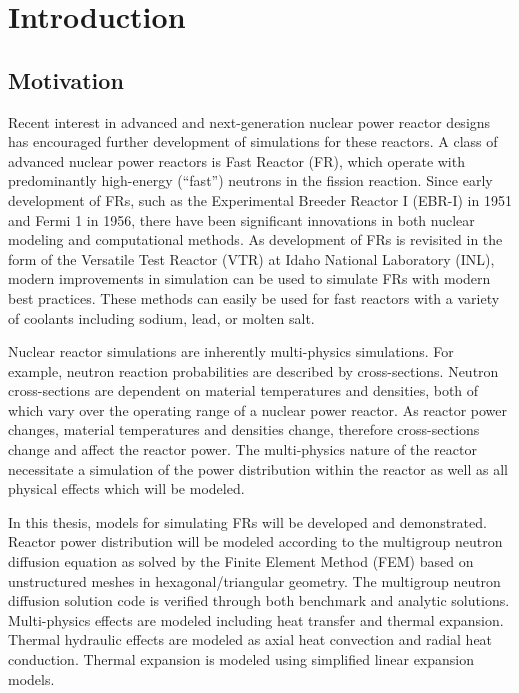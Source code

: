 \chapter{Introduction}
\label{ch:introduction}

\section{Motivation}
  Recent interest in advanced and next-generation nuclear power reactor designs 
  has encouraged further development of simulations for these reactors. A class 
  of advanced nuclear power reactors is Fast Reactor (FR), which operate with 
  predominantly high-energy (``fast'') neutrons in the fission reaction. Since 
  early development of FRs, such as the Experimental Breeder Reactor I (EBR-I) 
  in 1951 and Fermi 1 in 1956, there have been significant innovations in both 
  nuclear modeling and computational methods. As development of FRs is 
  revisited in the form of the Versatile Test Reactor (VTR) at Idaho National 
  Laboratory (INL), modern improvements in simulation can be used to simulate 
  FRs with modern best practices. These methods can easily be used for fast
  reactors with a variety of coolants including sodium, lead, or molten salt.

  Nuclear reactor simulations are inherently multi-physics simulations. For
  example, neutron reaction probabilities are described by cross-sections.
  Neutron cross-sections are dependent on material temperatures and densities,
  both of which vary over the operating range of a nuclear power reactor. As
  reactor power changes, material temperatures and densities change, therefore
  cross-sections change and affect the reactor power. The multi-physics nature
  of the reactor necessitate a simulation of the power distribution within the
  reactor as well as all physical effects which will be modeled. 
  
  In this thesis, models for simulating FRs will be developed and demonstrated. 
  Reactor power distribution will be modeled according to the multigroup neutron
  diffusion equation as solved by the Finite Element Method (FEM) based on
  unstructured meshes in hexagonal/triangular geometry. The multigroup neutron
  diffusion solution code is verified through both benchmark and analytic
  solutions. Multi-physics effects are modeled including heat transfer and 
  thermal expansion. Thermal hydraulic effects are modeled as axial heat 
  convection and radial heat conduction. Thermal expansion is modeled using 
  simplified linear expansion models.

